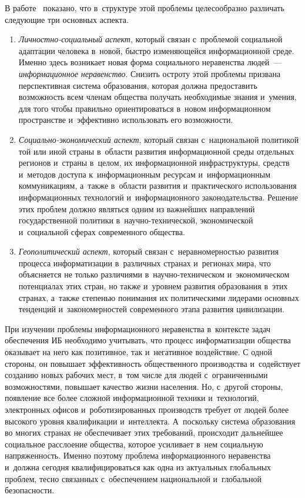 \begin{multicols}{2}
     В работе~\cite{19-kol} показано, что в~структуре этой проблемы 
целесообразно различать следующие три основных аспекта.
\begin{enumerate}[1.]
\item \textit{Личностно-социальный аспект}, который связан с~проблемой 
социальной адаптации человека в~новой, быстро изменяющейся 
информационной среде. Именно здесь возникает новая форма социального 
неравенства людей~--- \textit{информационное неравенство}. Снизить 
остроту этой проблемы призвана перспективная система образования, 
которая должна предоставить возможность всем членам общества получать 
необходимые знания и~умения, для того чтобы правильно ориентироваться 
в~новом информационном пространстве и~эффективно использовать его 
возможности.
    \item \textit{Социально-экономический аспект}, который связан 
с~национальной политикой той или иной страны в~области развития 
информационной среды отдельных регионов и~страны в~целом, их 
информационной инфраструктуры, средств и~методов доступа 
к~информационным ресурсам и~информационным коммуникациям, а~также 
в~области развития и~практического использования информационных 
технологий и~информационного законодательства. Решение этих проблем 
должно являться одним из важнейших направлений государственной 
политики в~на\-уч\-но-тех\-ни\-че\-ской, экономической и~социальной сферах 
современного общества.
     \item  \textit{Геополитический аспект}, который связан 
с~неравномерностью развития процесса информатизации в~различных 
странах и~регионах мира, что объясняется не только различиями  
в~на\-уч\-но-тех\-ни\-че\-ском и~экономическом потенциалах\linebreak
 этих стран, но 
также и~уровнем развития об\-разования в~этих странах, а~также степенью 
понима\-ния их политическими лидерами основных тенденций 
и~закономерностей современного этапа развития цивилизации.
    \end{enumerate}
    
При изучении проблемы информационного неравенства в~контексте задач 
обеспечения ИБ необходимо учитывать, что 
процесс информатизации общества оказывает на него как позитивное, так 
и~негативное воздействие. С одной стороны, он повышает эффективность 
общественного производства и~содействует созданию новых рабочих мест, 
в~том числе для людей с~ограниченными возможностями, повышает 
качество жизни населения. Но, с~другой стороны, появление все более 
сложной информационной техники и~технологий, электронных офисов 
и~роботизированных производств требует от людей более высокого уровня 
квалификации и~интеллекта. А~поскольку система образования во многих 
странах не обеспечивает этих требований, происходит дальнейшее 
социальное расслоение общества, которое усиливает в~нем социальную 
напряженность.
%
     Именно поэтому проб\-ле\-ма информационного неравенства и~должна 
сегодня квалифицироваться как одна из актуальных глобальных проблем, 
тесно связанных с~обеспечением национальной и~глобальной без\-опас\-ности.
{

}
\end{multicols}
